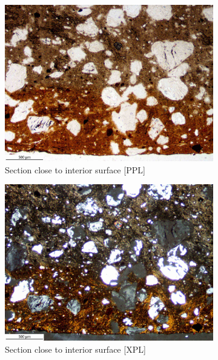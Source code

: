 \documentclass[a4paper]{article}
\begin{document}
\begin{figure}[H]
\begin{subfigure}[t]{.49\textwidth}
		\includegraphics[width=\textwidth]{ThinSections/9-2_4x_PPL.jpg}
		\caption{Section close to interior surface [PPL]}
	\end{subfigure}\hspace{.5em}\hfill
	\begin{subfigure}[t]{.49\textwidth}
		\includegraphics[width=\textwidth]{ThinSections/9-2_4x_XPL.jpg}
		\caption{Section close to interior surface [XPL]}
	\end{subfigure}
	\caption{}
	\label{fig:9_pik}
\end{figure}
\end{document}

